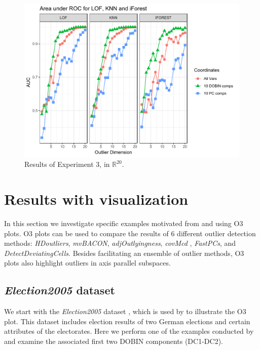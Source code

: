 \documentclass[11pt]{article}
\begin{document}
\begin{figure}[!ht]
	\centering
	\includegraphics[scale=0.5]{Exp3.pdf}
	\caption{Results of Experiment 3, in $\mathbb{R}^{20}$.}
	\label{fig:Exp3}
\end{figure} 

\section{Results with visualization}\label{sec:ResWithVis}
In this section we investigate specific examples motivated from \cite{unwin2019multivariate} and \cite{wilkinson2017visualizing} using  O3 plots. O3 plots \citep{unwin2019multivariate} can be used to compare the results of $6$ different outlier detection methods: \textit{HDoutliers},  \textit{mvBACON},  \textit{adjOutlyingness},  \textit{covMcd} , \textit{FastPCs},  and \textit{DetectDeviatingCells}. Besides facilitating an ensemble of outlier methods, O3 plots also highlight outliers in axis parallel subspaces. 

\subsection{\textit{Election2005} dataset}\label{sec:ResWithVis1}
We start with the \textit{Election2005} dataset \citep{mbgraphic}, which is used by \cite{unwin2019multivariate}  to illustrate the O3 plot. This dataset includes election results of two German elections and certain attributes of the electorates. Here we perform one of the examples conducted by  \cite{unwin2019multivariate} and examine the associated  first two DOBIN components (DC1-DC2). \\
\end{document}
